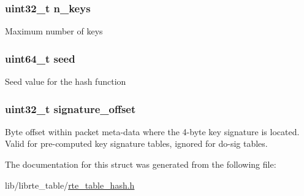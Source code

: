 \subsubsection[{n\+\_\+keys}]{\setlength{\rightskip}{0pt plus 5cm}uint32\+\_\+t n\+\_\+keys}\label{structrte__table__hash__lru__params_a4c48340399424293c79db3dc411e8231}
Maximum number of keys \hypertarget{structrte__table__hash__lru__params_a13dfa5fcb8e1184f1f7756e717fd2807}{}
\subsubsection[{seed}]{\setlength{\rightskip}{0pt plus 5cm}uint64\+\_\+t seed}\label{structrte__table__hash__lru__params_a13dfa5fcb8e1184f1f7756e717fd2807}
Seed value for the hash function \hypertarget{structrte__table__hash__lru__params_a255e199334632db5019afe0eb166a05a}{}
\subsubsection[{signature\+\_\+offset}]{\setlength{\rightskip}{0pt plus 5cm}uint32\+\_\+t signature\+\_\+offset}\label{structrte__table__hash__lru__params_a255e199334632db5019afe0eb166a05a}
Byte offset within packet meta-\/data where the 4-\/byte key signature is located. Valid for pre-\/computed key signature tables, ignored for do-\/sig tables. 

The documentation for this struct was generated from the following file\+:\begin{DoxyCompactItemize}
\item 
lib/librte\+\_\+table/\hyperlink{rte__table__hash_8h}{rte\+\_\+table\+\_\+hash.\+h}\end{DoxyCompactItemize}
